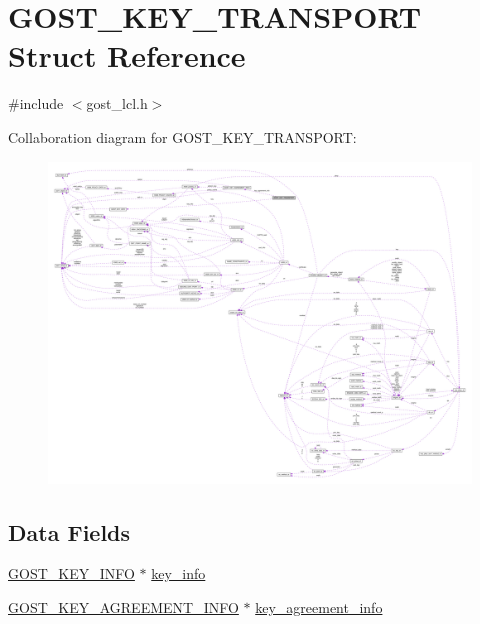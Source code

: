 \hypertarget{struct_g_o_s_t___k_e_y___t_r_a_n_s_p_o_r_t}{}\section{G\+O\+S\+T\+\_\+\+K\+E\+Y\+\_\+\+T\+R\+A\+N\+S\+P\+O\+RT Struct Reference}
\label{struct_g_o_s_t___k_e_y___t_r_a_n_s_p_o_r_t}


{\ttfamily \#include $<$gost\+\_\+lcl.\+h$>$}



Collaboration diagram for G\+O\+S\+T\+\_\+\+K\+E\+Y\+\_\+\+T\+R\+A\+N\+S\+P\+O\+RT\+:\nopagebreak
\begin{figure}[H]
\begin{center}
\leavevmode
\includegraphics[width=350pt]{struct_g_o_s_t___k_e_y___t_r_a_n_s_p_o_r_t__coll__graph}
\end{center}
\end{figure}
\subsection*{Data Fields}
\begin{DoxyCompactItemize}
\item 
\hyperlink{struct_g_o_s_t___k_e_y___i_n_f_o}{G\+O\+S\+T\+\_\+\+K\+E\+Y\+\_\+\+I\+N\+FO} $\ast$ \hyperlink{struct_g_o_s_t___k_e_y___t_r_a_n_s_p_o_r_t_a77322f4fa4c842f601d7cbf9125a7cb3}{key\+\_\+info}
\item 
\hyperlink{struct_g_o_s_t___k_e_y___a_g_r_e_e_m_e_n_t___i_n_f_o}{G\+O\+S\+T\+\_\+\+K\+E\+Y\+\_\+\+A\+G\+R\+E\+E\+M\+E\+N\+T\+\_\+\+I\+N\+FO} $\ast$ \hyperlink{struct_g_o_s_t___k_e_y___t_r_a_n_s_p_o_r_t_a781a63e166cf9414fd73bf6948736716}{key\+\_\+agreement\+\_\+info}
\end{DoxyCompactItemize}


